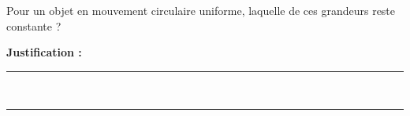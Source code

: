 Pour un objet en mouvement circulaire uniforme, laquelle de ces grandeurs reste constante ?

\choices

\noindent\textbf{Justification :} \hrulefill \\[2.5ex]
\rule{\linewidth}{0.4pt} \\[2.5ex]
\rule{\linewidth}{0.4pt}
\vfill
